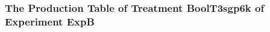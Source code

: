  \begin{frame}
 \fontsize{8pt}{9pt}\selectfont
 \frametitle{ The Production Table of Treatment BoolT3sgp6k of Experiment ExpB }

 \label{ExpBGrammarTable024.tex}  
 \end{frame}

